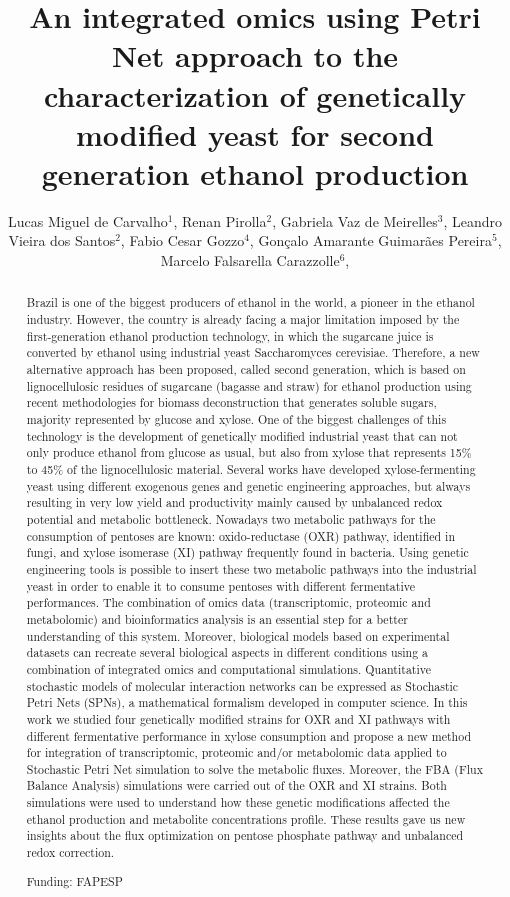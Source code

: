 \documentclass[twoside]{article}
\title{\vspace{-15mm}\fontsize{24pt}{10pt}\selectfont\textbf{ An integrated omics using Petri Net approach to the characterization of genetically modified yeast for second generation ethanol production }} %
\author{ Lucas Miguel de Carvalho$^{1}$, Renan Pirolla$^{2}$, Gabriela Vaz de Meirelles$^{3}$, Leandro Vieira dos Santos$^{2}$, Fabio Cesar Gozzo$^{4}$, Gonçalo Amarante Guimarães Pereira$^{5}$, Marcelo Falsarella Carazzolle$^{6}$, }
\affil{ 1 UNICAMP

2 CNPEM - CTBE

3 LGE - UNICAMP

4 UNICAMP - IQ

5 Brazilian Bioethanol Science and Technology Laboratory CTBE, Brazilian Center for Research in Energy and Materials CNPEM, Biology Institute – UNICAMP

6 Biology Institute - UNICAMP, National Center for High Performance Computing CENAPAD-SP/Unicamp

 }
\date{}
\begin{document}
  
  
  \maketitle %
  
  
  \thispagestyle{fancy} %
  
  
  \begin{abstract}
  Brazil is one of the biggest producers of ethanol in the world, a pioneer in the ethanol industry. However, the country is already facing a major limitation imposed by the first-generation ethanol production technology, in which the sugarcane juice is converted by ethanol using industrial yeast Saccharomyces cerevisiae. Therefore, a new alternative approach has been proposed, called second generation, which is based on lignocellulosic residues of sugarcane (bagasse and straw) for ethanol production using recent methodologies for biomass deconstruction that generates soluble sugars, majority represented by glucose and xylose. One of the biggest challenges of this technology is the development of genetically modified industrial yeast that can not only produce ethanol from glucose as usual, but also from xylose that represents 15\% to 45\% of the lignocellulosic material. Several works have developed xylose-fermenting yeast using different exogenous genes and genetic engineering approaches, but always resulting in very low yield and productivity mainly caused by unbalanced redox potential and metabolic bottleneck. Nowadays two metabolic pathways for the consumption of pentoses are known: oxido-reductase (OXR) pathway, identified in fungi, and xylose isomerase (XI) pathway frequently found in bacteria. Using genetic engineering tools is possible to insert these two metabolic pathways into the industrial yeast in order to enable it to consume pentoses with different fermentative performances. The combination of omics data (transcriptomic, proteomic and metabolomic) and bioinformatics analysis is an essential step for a better understanding of this system. Moreover, biological models based on experimental datasets can recreate several biological aspects in different conditions using a combination of integrated omics and computational simulations. Quantitative stochastic models of molecular interaction networks can be expressed as Stochastic Petri Nets (SPNs), a mathematical formalism developed in computer science. In this work we studied four genetically modified strains for OXR and XI pathways with different fermentative performance in xylose consumption and propose a new method for integration of transcriptomic, proteomic and/or metabolomic data applied to Stochastic Petri Net simulation to solve the metabolic fluxes. Moreover, the FBA (Flux Balance Analysis) simulations were carried out of the OXR and XI strains. Both simulations were used to understand how these genetic modifications affected the ethanol production and metabolite concentrations profile. These results gave us new insights about the flux optimization on pentose phosphate pathway and unbalanced redox correction.
  
  Funding: FAPESP \\ 
  \end{abstract}
  
\end{document}
